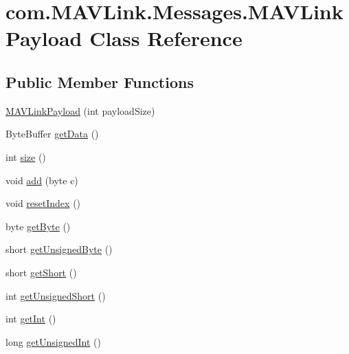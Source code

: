 \hypertarget{classcom_1_1MAVLink_1_1Messages_1_1MAVLinkPayload}{}\section{com.\+M\+A\+V\+Link.\+Messages.\+M\+A\+V\+Link\+Payload Class Reference}
\label{classcom_1_1MAVLink_1_1Messages_1_1MAVLinkPayload}
\subsection*{Public Member Functions}
\begin{DoxyCompactItemize}
\item 
\mbox{\hyperlink{classcom_1_1MAVLink_1_1Messages_1_1MAVLinkPayload_a52241a9e8926e1509ce7e0ca8c739650}{M\+A\+V\+Link\+Payload}} (int payload\+Size)
\item 
Byte\+Buffer \mbox{\hyperlink{classcom_1_1MAVLink_1_1Messages_1_1MAVLinkPayload_afe1be038f7949b4bb5c414376563a402}{get\+Data}} ()
\item 
int \mbox{\hyperlink{classcom_1_1MAVLink_1_1Messages_1_1MAVLinkPayload_acda2cb5765dc67990f291c6b276fd353}{size}} ()
\item 
void \mbox{\hyperlink{classcom_1_1MAVLink_1_1Messages_1_1MAVLinkPayload_ae0ce3288a9e8c34a612b345dca33d9c6}{add}} (byte c)
\item 
void \mbox{\hyperlink{classcom_1_1MAVLink_1_1Messages_1_1MAVLinkPayload_a86857b6eb119be6cc6dae40f4ce05e2a}{reset\+Index}} ()
\item 
byte \mbox{\hyperlink{classcom_1_1MAVLink_1_1Messages_1_1MAVLinkPayload_aa7100d3f072a6677e78efe43cdccaca4}{get\+Byte}} ()
\item 
short \mbox{\hyperlink{classcom_1_1MAVLink_1_1Messages_1_1MAVLinkPayload_a190a194ade51e14174a0c6e64c9da2c3}{get\+Unsigned\+Byte}} ()
\item 
short \mbox{\hyperlink{classcom_1_1MAVLink_1_1Messages_1_1MAVLinkPayload_a9ef986cba3b82750a388589b6271924e}{get\+Short}} ()
\item 
int \mbox{\hyperlink{classcom_1_1MAVLink_1_1Messages_1_1MAVLinkPayload_ad61629d49e813154162b45059fa456bb}{get\+Unsigned\+Short}} ()
\item 
int \mbox{\hyperlink{classcom_1_1MAVLink_1_1Messages_1_1MAVLinkPayload_a2ad2d098118daf0b4ccb2661634da1e0}{get\+Int}} ()
\item 
long \mbox{\hyperlink{classcom_1_1MAVLink_1_1Messages_1_1MAVLinkPayload_ad2337b7d232b6aea34566c9d139bacea}{get\+Unsigned\+Int}} ()

\end{DoxyCompactItemize}
